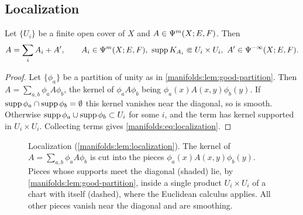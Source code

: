 \subsection{Localization}
\begin{lemma}\label{manifolds:lem:localization}
Let $\{U_i\}$ be a finite open cover of $X$ and $A\in\Psi^{m}(X;E,F)$. Then
\begin{equation}\label{manifolds:eq:localization}
A=\sum_iA_i+A',\qquad A_i\in\Psi^{m}(X;E,F),\ \operatorname{supp} K_{A_i}\Subset U_i\times U_i,\
A'\in\Psi^{-\infty}(X;E,F).
\end{equation}
\end{lemma}
\begin{proof}
Let $\{\phi_a\}$ be a partition of unity as in \cref{manifolds:lem:good-partition}.
Then $A=\sum_{a,b}\phi_aA\phi_b$, the kernel of $\phi_aA\phi_b$ being
$\phi_a(x)A(x,y)\phi_b(y)$. If $\operatorname{supp}\phi_a\cap\operatorname{supp}\phi_b=\emptyset$ this kernel
vanishes near the diagonal, so is smooth. Otherwise
$\operatorname{supp}\phi_a\cup\operatorname{supp}\phi_b\subset U_i$ for some $i$, and the term has kernel
supported in $U_i\times U_i$. Collecting terms gives \eqref{manifolds:eq:localization}.
\end{proof}

\begin{figure}[ht]
\centering
{}
\caption{Localization (\cref{manifolds:lem:localization}). The kernel of
$A=\sum_{a,b}\phi_aA\phi_b$ is cut into the pieces
$\phi_a(x)A(x,y)\phi_b(y)$. Pieces whose supports meet the diagonal (shaded)
lie, by \cref{manifolds:lem:good-partition}, inside a single product
$U_i\times U_i$ of a chart with itself (dashed), where the Euclidean calculus
applies. All other pieces vanish near the diagonal and are smoothing.}
\label{manifolds:fig:localization}
\end{figure}

